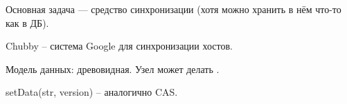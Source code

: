 Основная задача --- средство синхронизации (хотя можно хранить в нём что-то как в ДБ).

Chubby -- система Google для синхронизации хостов. 

Модель данных: древовидная.
Узел может делать .

setData(str, version) -- аналогично CAS.


